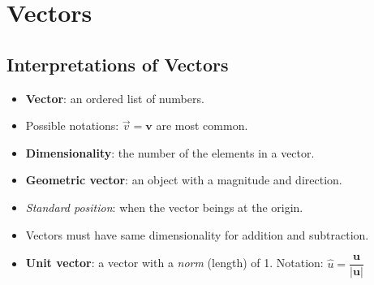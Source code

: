 \documentclass[12pt,a4paper]{article}
\begin{document}
\tableofcontents
\cleardoublepage
\fancyhead{}

\clearpage
\section{Vectors}
\subsection{Interpretations of Vectors}
\begin{itemize}
    \item \textbf{Vector}: an ordered list of numbers. 
    \item Possible notations: \(\vec{v}=\bm{v}\) are most common.
    \item \textbf{Dimensionality}: the number of the elements in a vector.
    \item \textbf{Geometric vector}: an object with a magnitude and direction.
    \item \textit{Standard position}: when the vector beings at the origin.
    \item Vectors must have same dimensionality for addition and subtraction.
    \item \textbf{Unit vector}: a vector with a \textit{norm} (length) of 1. Notation: \(\hat{u}=\dfrac{\bm{u}}{|\bm{u}|}\) 
\end{itemize}
\end{document}

